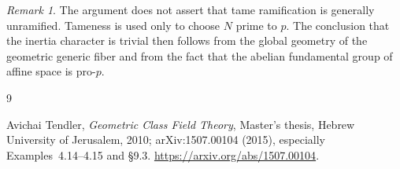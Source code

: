 \documentclass[11pt]{article}
\theoremstyle{remark}
\newtheorem*{remark}{Remark}
\begin{document}
\begin{remark}
The argument does not assert that tame ramification is generally
unramified.  Tameness is used only to choose $N$ prime to $p$.  The conclusion
that the inertia character is trivial then follows from the global geometry
of the geometric generic fiber and from the fact that the abelian fundamental
group of affine space is pro-$p$.
\end{remark}

\begin{thebibliography}{9}

Avichai Tendler,
\emph{Geometric Class Field Theory},
Master's thesis, Hebrew University of Jerusalem, 2010;
arXiv:1507.00104 (2015), especially Examples~4.14--4.15 and \S9.3.
\url{https://arxiv.org/abs/1507.00104}.

\end{thebibliography}
\end{document}
